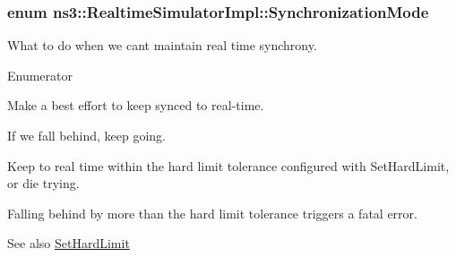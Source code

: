\subsubsection[{\texorpdfstring{Synchronization\+Mode}{SynchronizationMode}}]{\setlength{\rightskip}{0pt plus 5cm}enum {\bf ns3\+::\+Realtime\+Simulator\+Impl\+::\+Synchronization\+Mode}}\hypertarget{classns3_1_1RealtimeSimulatorImpl_a97b84e6926b9602a6d7c7326bf485807}{}\label{classns3_1_1RealtimeSimulatorImpl_a97b84e6926b9602a6d7c7326bf485807}
What to do when we can\textquotesingle{}t maintain real time synchrony. \begin{Desc}
\item[Enumerator]\par
\begin{description}
\item[{\em 
S\+Y\+N\+C\+\_\+\+B\+E\+S\+T\+\_\+\+E\+F\+F\+O\+RT\hypertarget{classns3_1_1RealtimeSimulatorImpl_a97b84e6926b9602a6d7c7326bf485807aa22b68b600e38987c93c0b3eb786aefe}{}\label{classns3_1_1RealtimeSimulatorImpl_a97b84e6926b9602a6d7c7326bf485807aa22b68b600e38987c93c0b3eb786aefe}
}]Make a best effort to keep synced to real-\/time.

If we fall behind, keep going. \item[{\em 
S\+Y\+N\+C\+\_\+\+H\+A\+R\+D\+\_\+\+L\+I\+M\+IT\hypertarget{classns3_1_1RealtimeSimulatorImpl_a97b84e6926b9602a6d7c7326bf485807ada42280d3e94930f3335552b4a93a36d}{}\label{classns3_1_1RealtimeSimulatorImpl_a97b84e6926b9602a6d7c7326bf485807ada42280d3e94930f3335552b4a93a36d}
}]Keep to real time within the hard limit tolerance configured with Set\+Hard\+Limit, or die trying.

Falling behind by more than the hard limit tolerance triggers a fatal error. \begin{DoxySeeAlso}{See also}
\hyperlink{classns3_1_1RealtimeSimulatorImpl_a665c879b7ff27eb6a98fb12b04f56490}{Set\+Hard\+Limit} 
\end{DoxySeeAlso}
\end{description}
\end{Desc}

